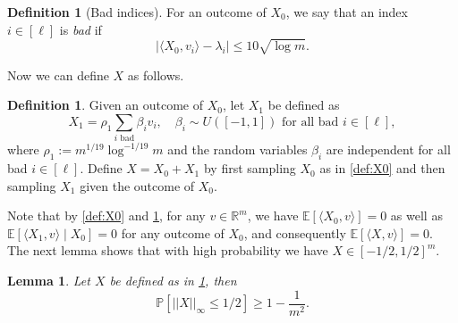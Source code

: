 \documentclass[reqno]{amsart}
\newtheorem{lemma}[theorem]{Lemma}
\theoremstyle{remark}
\theoremstyle{definition}
\newtheorem{definition}[theorem]{Definition}
\numberwithin{theorem}{section}
\renewcommand{\(}{\bigl(}
\renewcommand{\)}{\bigr)\vphantom{)}}
\newcommand{\E}{\mathbb{E}}
\renewcommand{\le}{\leqslant}
\renewcommand{\ge}{\geqslant}
\renewcommand{\P}{\mathbb{P}}
\newcommand{\R}{\mathbb R}
\newcommand{\ang}[1]{\langle#1\rangle}
\begin{document}
\begin{definition}[Bad indices]\label{def:bad-index}
    For an outcome of $X_0$, we say that an index $i\in [\ell]$ is \emph{bad} if 
    \[|\ang{X_0, v_i} - \lambda_i| \le 10\sqrt{\log m}.\]
\end{definition}

Now we can define $X$ as follows.

\begin{definition}\label{def:X}
Given an outcome of $X_0$, let $X_1$ be defined as
\[X_1  =\rho_1 \sum_{i \text{ bad}}\beta_i v_i, \quad \beta_i\sim U([-1,1])\text{ for all bad $i\in [\ell]$},\]
where $\rho_1 := m^{1/19}\log^{-1/19}m$ and the random variables $\beta_i$ are independent for all bad $i\in [\ell]$. Define $X = X_0+X_1$ by first sampling $X_0$ as in \cref{def:X0} and then sampling $X_1$ given the outcome of $X_0$. 
\end{definition}

Note that by \cref{def:X0} and \cref{def:X}, for any $v\in \R^m$, we have  $\E[\ang{X_0,v}] = 0$ as well as $\E[\ang{X_1,v}\mid X_0] = 0$ for any outcome of $X_0$, and consequently $\E[\ang{X,v}] = 0$. The next lemma shows that with high probability we have $X\in [-1/2,1/2]^m$.

\begin{lemma}\label{lem:X-bounded-infty-norm}
    Let $X$ be defined as in \cref{def:X}, then 
    \[\P[||X||_\infty \le 1/2] \ge 1-\frac{1}{m^2}.\]
\end{lemma}
\end{document}
